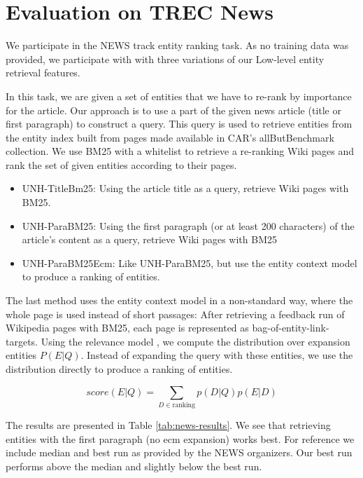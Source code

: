 \documentclass{article}
\begin{document}
\section{Evaluation on TREC News}

We participate in the NEWS track entity ranking task. As no training data was provided, we participate with with three variations of our Low-level entity retrieval features.

In this task, we are given a set of entities that we have to re-rank by importance for the article. Our approach is to use a part of the given news article (title or first paragraph) to construct a query. This query is used to retrieve entities from the entity index built from pages made available in CAR's allButBenchmark collection. We use BM25 with a whitelist to retrieve a re-ranking Wiki pages and rank the set of given entities according to their pages.

\begin{itemize}
    \item UNH-TitleBm25: Using the article title as a query, retrieve Wiki pages with BM25.  
    \item UNH-ParaBM25: Using the first paragraph (or at least 200 characters) of the article's content as a query, retrieve Wiki pages with BM25
    \item UNH-ParaBM25Ecm:  Like UNH-ParaBM25, but use the entity context model \cite{dalton2014entity} to produce a ranking of entities.
\end{itemize}

The last method uses the entity context model in a non-standard way, where the whole page is used instead of short passages: After retrieving a feedback run of Wikipedia pages with BM25, each page is represented as bag-of-entity-link-targets. Using the relevance model \cite{lavrenko2017relevance}, we compute the distribution over expansion entities $P(E|Q)$. Instead of expanding the query with these entities, we use the distribution directly to produce a ranking of entities.

$$ score(E|Q)= \sum_{D\in \text{ranking}} p(D|Q) p(E|D)$$

The results are presented in Table \ref{tab:news-results}. We see that retrieving entities with the first paragraph (no ecm expansion) works best. For reference we include median and best run as provided by the NEWS organizers. Our best run performs above the median and slightly below the best run.


\end{document}
